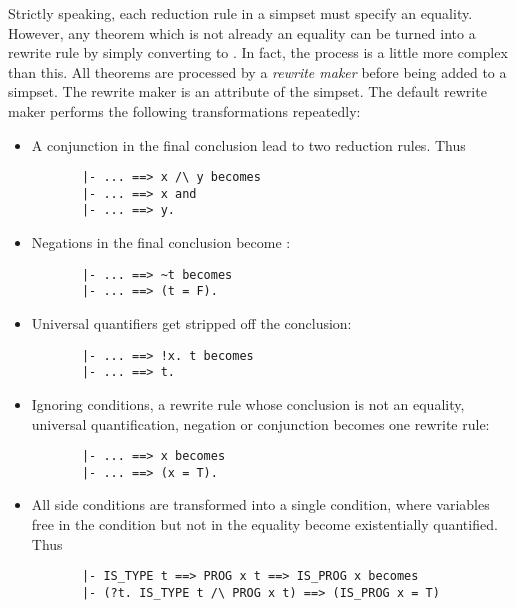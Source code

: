 Strictly speaking, each reduction rule in a simpset must specify an
equality. However, any theorem which is not already an
equality can be turned into a rewrite rule by simply
converting  to .
In fact, the process is a little more complex than this.
All theorems are processed by a {\em rewrite maker}
before being added to a simpset.  The rewrite maker is
an attribute of the simpset.  The default rewrite maker
performs the following transformations repeatedly:
\begin{itemize}
    \item A conjunction in the final conclusion lead to
    two reduction rules.  Thus
\begin{hol} \begin{verbatim}
       |- ... ==> x /\ y becomes
       |- ... ==> x and
       |- ... ==> y.
\end{verbatim} \end{hol}

    \item Negations  in the final conclusion become :
    \begin{hol} \begin{verbatim}
       |- ... ==> ~t becomes
       |- ... ==> (t = F).
\end{verbatim} \end{hol}

    \item Universal quantifiers get stripped off the
    conclusion:
    \begin{hol} \begin{verbatim}
       |- ... ==> !x. t becomes
       |- ... ==> t.
\end{verbatim} \end{hol}

    \item Ignoring conditions, a rewrite rule whose conclusion
    is not an equality, universal quantification,
    negation or conjunction becomes one rewrite rule:
    \begin{hol} \begin{verbatim}
       |- ... ==> x becomes
       |- ... ==> (x = T).
\end{verbatim} \end{hol}

    \item All side conditions are transformed into a single condition,
    where variables free in the condition but not in the equality
    become existentially quantified.  Thus
    \begin{hol} \begin{verbatim}
       |- IS_TYPE t ==> PROG x t ==> IS_PROG x becomes
       |- (?t. IS_TYPE t /\ PROG x t) ==> (IS_PROG x = T)
\end{verbatim} \end{hol}
\end{itemize}

